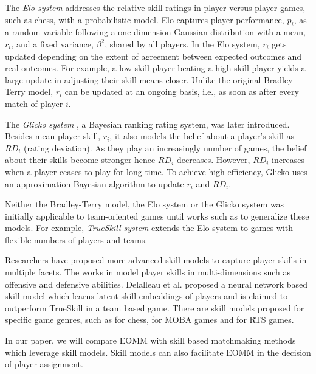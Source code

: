 The \textit{Elo system} \cite{elo1978rating} addresses the relative skill ratings in player-versus-player games, such as chess, with a probabilistic model. Elo captures player performance, $p_i$, as a random variable following a one dimension Gaussian distribution with a mean, $r_i$, and a fixed variance, $\beta^2$, shared by all players. In the Elo system, $r_i$ gets updated depending on the extent of agreement between expected outcomes and real outcomes. For example, a low skill player beating a high skill player yields a large update in adjusting their skill means closer. Unlike the original Bradley-Terry model, $r_i$ can be updated at an ongoing basis, i.e., as soon as after every match of player $i$.

The \textit{Glicko system} \cite{glickman1999parameter}, a Bayesian ranking rating system, was later introduced. Besides mean player skill, $r_i$, it also models the belief about a player's skill as $RD_i$ (rating deviation). As they play an increasingly number of games, the belief about their skills become stronger hence $RD_i$ decreases. However, $RD_i$ increases when a player ceases to play for long time. To achieve high efficiency, Glicko uses an approximation Bayesian algorithm to update $r_i$ and $RD_i$.

Neither the Bradley-Terry model, the Elo system or the Glicko system was initially applicable to team-oriented games until works such as \cite{herbrich:trueskill,huang2004generalized,menke2008bradley} to generalize these models. For example, \textit{TrueSkill system} \cite{herbrich:trueskill} extends the Elo system to games with flexible numbers of players and teams.

Researchers have proposed more advanced skill models to capture player skills in multiple facets. The works in \cite{chen2016modeling,stanescu2011rating} model player skills in multi-dimensions such as offensive and defensive abilities. Delalleau et al.  \cite{Delalleau2012} proposed a neural network based skill model which learns latent skill embeddings of players and is claimed to outperform TrueSkill in a team based game. There are skill models proposed for specific game genres, such as \cite{di2009skill} for chess, \cite{zhengxing2016player,suznjevic2015application} for MOBA games and for \cite{avontuur2013player} RTS games.

In our paper, we will compare EOMM with skill based matchmaking methods which leverage skill models. Skill models can also facilitate EOMM in the decision of player assignment.

